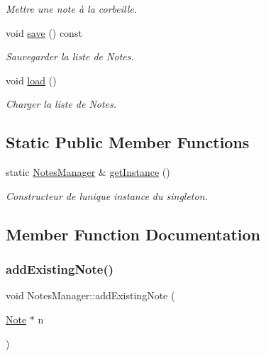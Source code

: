 \begin{DoxyCompactItemize}
\begin{DoxyCompactList}\small\item\em Mettre une note à la corbeille. \end{DoxyCompactList}\item 
void \hyperlink{class_notes_manager_ad271bd7f8079b01b04a32b886b498bac}{save} () const
\begin{DoxyCompactList}\small\item\em Sauvegarder la liste de Notes. \end{DoxyCompactList}\item 
void \hyperlink{class_notes_manager_ad4fb2de50633dd25b71024343341cd64}{load} ()
\begin{DoxyCompactList}\small\item\em Charger la liste de Notes. \end{DoxyCompactList}\end{DoxyCompactItemize}
\subsection*{Static Public Member Functions}
\begin{DoxyCompactItemize}
\item 
static \hyperlink{class_notes_manager}{Notes\+Manager} \& \hyperlink{class_notes_manager_a62868e66f00cf991822c7ffd5e751b31}{get\+Instance} ()
\begin{DoxyCompactList}\small\item\em Constructeur de l\textquotesingle{}unique instance du singleton. \end{DoxyCompactList}\end{DoxyCompactItemize}


\subsection{Member Function Documentation}
\mbox{\label{class_notes_manager_a2155d076ae6e1044e621f90ebc669466}} 
\subsubsection{\texorpdfstring{add\+Existing\+Note()}{addExistingNote()}}
{\footnotesize\ttfamily void Notes\+Manager\+::add\+Existing\+Note (\begin{DoxyParamCaption}\item[{\hyperlink{class_note}{Note} $\ast$}]{n }\end{DoxyParamCaption})}



